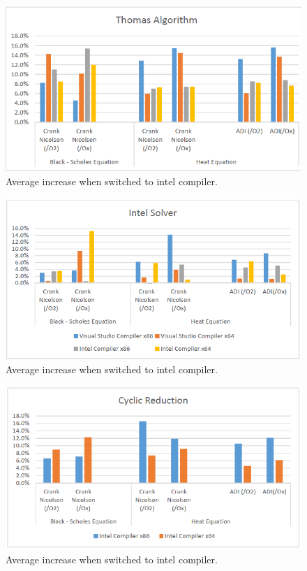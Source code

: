 \documentclass[12pt, oneside]{book}
\theoremstyle{plain}
\theoremstyle{definition}
\begin{document}
\begin{figure}[!htb]
    \centering
        \includegraphics[scale=0.6]{thomasFlagBar.png}
    \caption{Average increase when switched to intel compiler.}
\end{figure}

\begin{figure}[!htb]
    \centering
        \includegraphics[scale=0.6]{intelFlagBar.png}
    \caption{Average increase when switched to intel compiler.}
\end{figure}

\begin{figure}[!htb]
    \centering
        \includegraphics[scale=0.6]{cyclicFlagBar.png}
    \caption{Average increase when switched to intel compiler.}
\end{figure}
\end{document}
